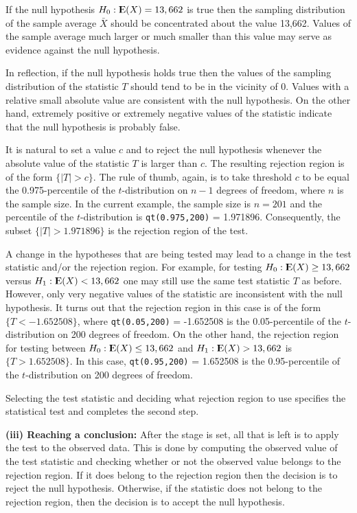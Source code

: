 \documentclass[]{krantz}
\newcommand{\Expec}{{\rm I\kern-.3em E}}
\theoremstyle{definition}
\theoremstyle{definition}
\theoremstyle{definition}
\theoremstyle{remark}
\begin{document}
If the null hypothesis \(H_0:\Expec(X) = 13,662\) is true then the
sampling distribution of the sample average \(\bar X\) should be
concentrated about the value 13,662. Values of the sample average much
larger or much smaller than this value may serve as evidence against the
null hypothesis.

In reflection, if the null hypothesis holds true then the values of the
sampling distribution of the statistic \(T\) should tend to be in the
vicinity of 0. Values with a relative small absolute value are
consistent with the null hypothesis. On the other hand, extremely
positive or extremely negative values of the statistic indicate that the
null hypothesis is probably false.

It is natural to set a value \(c\) and to reject the null hypothesis
whenever the absolute value of the statistic \(T\) is larger than \(c\). The
resulting rejection region is of the form \(\{|T| > c\}\). The rule of
thumb, again, is to take threshold \(c\) to be equal the 0.975-percentile
of the \(t\)-distribution on \(n-1\) degrees of freedom, where \(n\) is the
sample size. In the current example, the sample size is \(n=201\) and the
percentile of the \(t\)-distribution is \texttt{qt(0.975,200)} = 1.971896.
Consequently, the subset \(\{|T| > 1.971896\}\) is the rejection region of
the test.

A change in the hypotheses that are being tested may lead to a change in
the test statistic and/or the rejection region. For example, for testing
\(H_0: \Expec(X) \geq 13,662\) versus \(H_1: \Expec(X) < 13,662\) one may
still use the same test statistic \(T\) as before. However, only very
negative values of the statistic are inconsistent with the null
hypothesis. It turns out that the rejection region in this case is of
the form \(\{T < -1.652508\}\), where \texttt{qt(0.05,200)} = -1.652508 is the
0.05-percentile of the \(t\)-distribution on 200 degrees of freedom. On
the other hand, the rejection region for testing between
\(H_0: \Expec(X) \leq 13,662\) and \(H_1: \Expec(X) > 13,662\) is
\(\{T > 1.652508\}\). In this case, \texttt{qt(0.95,200)} = 1.652508 is the
0.95-percentile of the \(t\)-distribution on 200 degrees of freedom.

Selecting the test statistic and deciding what rejection region to use
specifies the statistical test and completes the second step.

{\textbf{(iii) Reaching a conclusion:}} After the stage is set, all that is
left is to apply the test to the observed data. This is done by
computing the observed value of the test statistic and checking whether
or not the observed value belongs to the rejection region. If it does
belong to the rejection region then the decision is to reject the null
hypothesis. Otherwise, if the statistic does not belong to the rejection
region, then the decision is to accept the null hypothesis.
\end{document}
